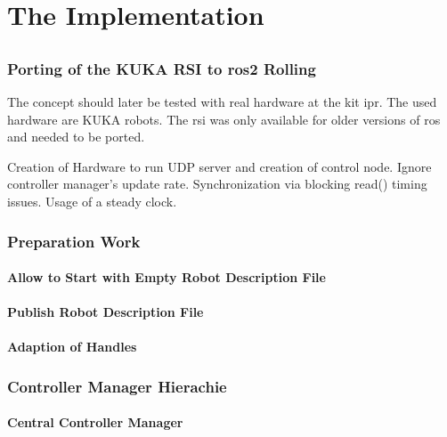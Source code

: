 \part{The Implementation}
\chapter{}
\label{sec:implementation}

\section{Porting of the KUKA RSI to \gls{ros2} Rolling}
The concept should later be tested with real hardware at the \gls{kit} \gls{ipr}. The used hardware are KUKA robots. The \gls{rsi} was only available for older versions of \gls{ros} and needed to be ported.\newline


Creation of Hardware to run UDP server and creation of control node. Ignore controller manager's update rate. Synchronization via blocking read() timing issues. Usage of a steady clock.

\section{Preparation Work}

\subsection{Allow to Start with Empty Robot Description File}

\subsection{Publish Robot Description File}

\subsection{Adaption of Handles}

\section{Controller Manager Hierachie}
\subsection{Central Controller Manager}
